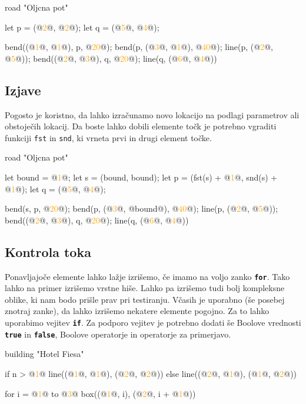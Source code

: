 \documentclass{article}
\newcommand\Num[1]{\textcolor{orange}{#1}}
\newcommand\Keyword[1]{{\textbf{\texttt{#1}}}}
\newcommand\Fun[1]{{\texttt{#1}}}
\begin{document}
\begin{CITY}
  road "Oljcna pot" {
    let p = (@\Num{2}@, @\Num{2}@);
    let q = (@\Num{5}@, @\Num{4}@);

    bend((@\Num{1}@, @\Num{1}@), p, @\Num{20}@);
    bend(p, (@\Num{3}@, @\Num{1}@), @\Num{40}@);
    line(p, (@\Num{2}@, @\Num{5}@));
    bend((@\Num{2}@, @\Num{3}@), q, @\Num{20}@);
    line(q, (@\Num{6}@, @\Num{4}@))
  }
\end{CITY}

\subsection{Izjave}
Pogosto je koristno, da lahko izračunamo novo lokacijo na podlagi parametrov ali obstoječih lokacij.
Da boste lahko dobili elemente točk je potrebno vgraditi funkciji \Fun{fst} in \Fun{snd}, ki vrneta prvi in drugi element točke.

\begin{CITY}
  road "Oljcna pot" {
    let bound = @\Num{1}@;
    let s = (bound, bound);
    let p = (fst(s) + @\Num{1}@, snd(s) + @\Num{1}@);
    let q = (@\Num{5}@, @\Num{4}@);

    bend(s, p, @\Num{20}@);
    bend(p, (@\Num{3}@, @bound@), @\Num{40}@);
    line(p, (@\Num{2}@, @\Num{5}@));
    bend((@\Num{2}@, @\Num{3}@), q, @\Num{20}@);
    line(q, (@\Num{6}@, @\Num{4}@))
  }
\end{CITY}

\subsection{Kontrola toka}
Ponavljajoče elemente lahko lažje izrišemo, če imamo na voljo zanko \Keyword{for}.
Tako lahko na primer izrišemo vrstne hiše.
Lahko pa izrišemo tudi bolj kompleksne oblike, ki nam bodo prišle prav pri testiranju.
Včasih je uporabno (še posebej znotraj zanke), da lahko izrišemo nekatere elemente pogojno.
Za to lahko uporabimo vejitev \Keyword{if}.
Za podporo vejitev je potrebno dodati še Boolove vrednosti \Keyword{true} in \Keyword{false}, Boolove operatorje in operatorje za primerjavo.

\begin{CITY}
  building "Hotel Fiesa" {
    if n > @\Num{1}@ {
      line((@\Num{1}@, @\Num{1}@), (@\Num{2}@, @\Num{2}@))
    } else {
      line((@\Num{2}@, @\Num{1}@), (@\Num{1}@, @\Num{2}@))
    }

    for i = @\Num{1}@ to @\Num{3}@ {
      box((@\Num{1}@, i), (@\Num{2}@, i + @\Num{1}@))
    }
  }
\end{CITY}
\end{document}
